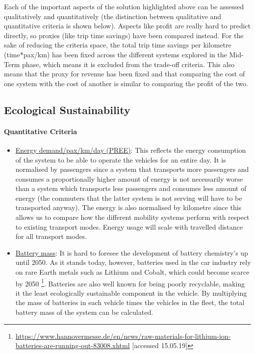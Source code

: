 Each of the important aspects of the solution highlighted above can be assessed qualitatively and quantitatively (the distinction between qualitative and quantitative criteria is shown below). Aspects like profit are really hard to predict directly, so proxies (like trip time savings) have been compared instead. For the sake of reducing the criteria space, the total trip time savings per kilometre (time*pax/km) has been fixed across the different systems explored in the Mid-Term phase, which means it is excluded from the trade-off criteria. This also means that the proxy for revenue has been fixed and that comparing the cost of one system with the cost of another is similar to comparing the profit of the two.

\subsection{Ecological Sustainability}

\paragraph{Quantitative Criteria}

\begin{itemize}
    \item \underline{Energy demand/pax/km/day (PREE)}: This reflects the energy consumption of the system to be able to operate the vehicles for an entire day. It is normalised by passengers since a system that transports more passengers and consumes a proportionally higher amount of energy is not necessarily worse than a system which transports less passengers and consumes less amount of energy (the commuters that the latter system is not serving will have to be transported anyway). The energy is also normalised by kilometre since this allows us to compare how the different mobility systems perform with respect to existing transport modes. Energy usage will scale with travelled distance for all transport modes.  %
    \item \underline{Battery mass}: It is hard to foresee the development of battery chemistry's up until 2050. As it stands today, however, batteries used in the car industry rely on rare Earth metals such as Lithium and Cobalt, which could become scarce by 2050 \footnote{\url{https://www.hannovermesse.de/en/news/raw-materials-for-lithium-ion-batteries-are-running-out-83008.xhtml} [accessed 15.05.19]}. Batteries are also well known for being poorly recyclable, making it the least ecologically sustainable component in the vehicle. By multiplying the mass of batteries in each vehicle times the vehicles in the fleet, the total battery mass of the system can be calculated.
    
\end{itemize}


